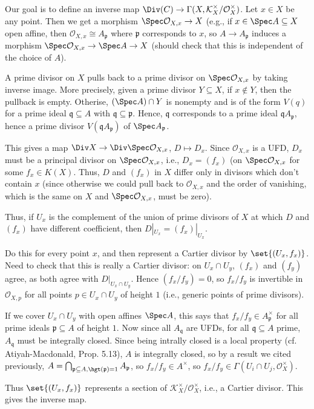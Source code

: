 Our goal is to define an inverse map $\Div(C) \to \Gamma(X, \mathcal{K}_X^\times/\mathcal{O}_X^\times)$.
Let $x \in X$ be any point. Then we get a morphism $\Spec \mathcal{O}_{X, x}\to X$
(e.g., if $x \in \Spec A \subseteq X$ open affine, then $\mathcal{O}_{X, x}\cong A_{\mathfrak{p}}$ where
$\mathfrak{p}$ corresponds to $x$, so $A\to A_{\mathfrak{p}}$ induces a morphism
$\Spec \mathcal{O}_{X, x}\to \Spec A\to X$ (should check that this is independent of
the choice of $A$).

A prime divisor on $X$ pulls back to a prime divisor on $\Spec \mathcal{O}_{X, x}$ by
taking inverse image. More precisely, given a prime divisor $Y \subseteq X$, if $x\notin Y$,
then the pullback is empty. Otherise, $(\Spec A)\cap Y$ is nonempty and is of the
form $V(q)$ for a prime ideal $\mathfrak{q} \subseteq A$ with $\mathfrak{q} \subseteq \mathfrak{p}$.
Hence, $\mathfrak{q}$ corresponds to a prime ideal $\mathfrak{q}A_{\mathfrak{p}}$, hence
a prime divisor $V(\mathfrak{q}A_{\mathfrak{p}})$ of $\Spec A_{\mathfrak{p}}$.

This gives a map $\Div X\to \Div\Spec \mathcal{O}_{X, x}$, $D\mapsto D_x$. Since $\mathcal{O}_{X, x}$ is
a UFD, $D_x$ must be a principal divisor on $\Spec \mathcal{O}_{X, x}$, i.e., $D_x = (f_x)$
(on $\Spec \mathcal{O}_{X, x}$ for some $f_x \in K(X)$. Thus, $D$ and $(f_x)$ in $X$
differ only in divisors which don't contain $x$ (since otherwise we could pull back
to $\mathcal{O}_{X, x}$ and the order of vanishing, which is the same on $X$ and $\Spec \mathcal{O}_{X, x}$,
must be zero).

Thus, if $U_x$ is the complement of the union of prime divisors of $X$ at which $D$
and $(f_x)$ have different coefficient, then $D|_{U_x} = (f_x)|_{U_x}$.

Do this for every point $x$, and then represent a Cartier divisor by $\set{(U_x, f_x)}$.
Need to check that this is really a Cartier divisor: on $U_x\cap U_y$,
$(f_x)$ and $(f_y)$ agree, as both agree with $D|_{U_x\cap U_y}$. Hence
$(f_x/f_y)=0$, so $f_x/f_y$ is invertible in $\mathcal{O}_{X, p}$ for all points
$p \in U_x\cap U_y$ of height $1$ (i.e., generic points of prime divisors).

If we cover $U_x\cap U_y$ with open affines $\Spec A$, this says that
$f_x/f_y \in A_{\mathfrak{p}}^\times$ for all prime ideals $\mathfrak{p} \subseteq A$ of
height $1$. Now since all $A_{\mathfrak{q}}$ are UFDs, for all $\mathfrak{q} \subseteq A$ prime,
$A_{\mathfrak{q}}$ must be integrally closed. Since being intrally closed is a local
property (cf. Atiyah-Macdonald, Prop. 5.13), $A$ is integrally closed, so by a
result we cited previously, $A = \bigcap_{\mathfrak{p} \subseteq A, \hgt(\mathfrak{p})=1}A_{\mathfrak{p}}$,
so $f_x/f_y \in A^\times$, so $f_x/f_y \in \Gamma(U_i\cap U_j, \mathcal{O}_X^\times)$.

Thus $\set{(U_x, f_x)}$ represents a section of $\mathcal{K}_X^\times/\mathcal{O}_X^\times$,
i.e., a Cartier divisor. This gives the inverse map.
